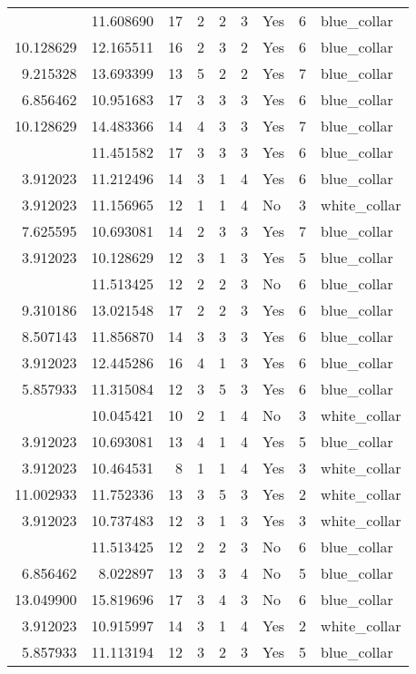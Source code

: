 \documentclass[
]{article}
\begin{document}
\begin{longtable}[t]{rrrrrllrl}
\addlinespace
8.787220 & 11.608690 & 17 & 2 & 2 & 3 & Yes & 6 & blue\_collar\\
10.128629 & 12.165511 & 16 & 2 & 3 & 2 & Yes & 6 & blue\_collar\\
9.215328 & 13.693399 & 13 & 5 & 2 & 2 & Yes & 7 & blue\_collar\\
6.856462 & 10.951683 & 17 & 3 & 3 & 3 & Yes & 6 & blue\_collar\\
10.128629 & 14.483366 & 14 & 4 & 3 & 3 & Yes & 7 & blue\_collar\\
\addlinespace
8.707814 & 11.451582 & 17 & 3 & 3 & 3 & Yes & 6 & blue\_collar\\
3.912023 & 11.212496 & 14 & 3 & 1 & 4 & Yes & 6 & blue\_collar\\
3.912023 & 11.156965 & 12 & 1 & 1 & 4 & No & 3 & white\_collar\\
7.625595 & 10.693081 & 14 & 2 & 3 & 3 & Yes & 7 & blue\_collar\\
3.912023 & 10.128629 & 12 & 3 & 1 & 3 & Yes & 5 & blue\_collar\\
\addlinespace
9.215328 & 11.513425 & 12 & 2 & 2 & 3 & No & 6 & blue\_collar\\
9.310186 & 13.021548 & 17 & 2 & 2 & 3 & Yes & 6 & blue\_collar\\
8.507143 & 11.856870 & 14 & 3 & 3 & 3 & Yes & 6 & blue\_collar\\
3.912023 & 12.445286 & 16 & 4 & 1 & 3 & Yes & 6 & blue\_collar\\
5.857933 & 11.315084 & 12 & 3 & 5 & 3 & Yes & 6 & blue\_collar\\
\addlinespace
3.912023 & 10.045421 & 10 & 2 & 1 & 4 & No & 3 & white\_collar\\
3.912023 & 10.693081 & 13 & 4 & 1 & 4 & Yes & 5 & blue\_collar\\
3.912023 & 10.464531 & 8 & 1 & 1 & 4 & Yes & 3 & white\_collar\\
11.002933 & 11.752336 & 13 & 3 & 5 & 3 & Yes & 2 & white\_collar\\
3.912023 & 10.737483 & 12 & 3 & 1 & 3 & Yes & 3 & white\_collar\\
\addlinespace
9.215328 & 11.513425 & 12 & 2 & 2 & 3 & No & 6 & blue\_collar\\
6.856462 & 8.022897 & 13 & 3 & 3 & 4 & No & 5 & blue\_collar\\
13.049900 & 15.819696 & 17 & 3 & 4 & 3 & No & 6 & blue\_collar\\
3.912023 & 10.915997 & 14 & 3 & 1 & 4 & Yes & 2 & white\_collar\\
5.857933 & 11.113194 & 12 & 3 & 2 & 3 & Yes & 5 & blue\_collar\\

\end{longtable}
\end{document}
